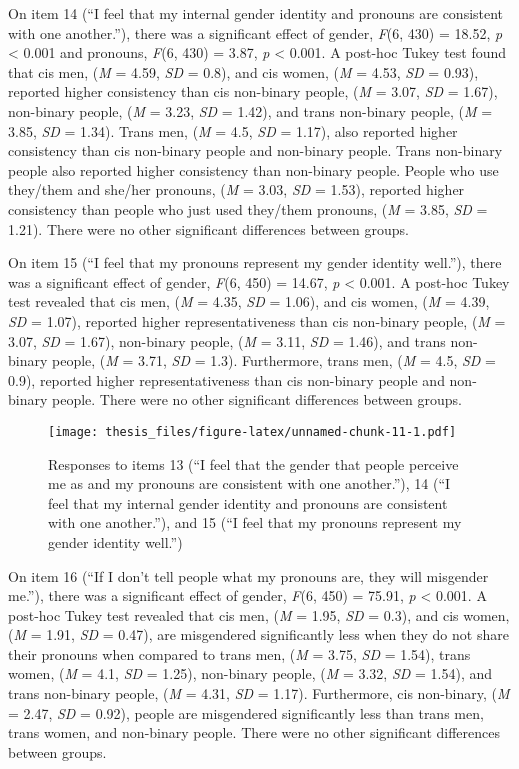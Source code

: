 \documentclass[12pt,twoside]{reedthesis}
\begin{document}
On item 14 (``I feel that my internal gender identity and pronouns are consistent with one another.''), there was a significant effect of gender, \emph{F}(6, 430) = 18.52, \emph{p} \textless{} 0.001 and pronouns, \emph{F}(6, 430) = 3.87, \emph{p} \textless{} 0.001. A post-hoc Tukey test found that cis men, (\emph{M} = 4.59, \emph{SD} = 0.8), and cis women, (\emph{M} = 4.53, \emph{SD} = 0.93), reported higher consistency than cis non-binary people, (\emph{M} = 3.07, \emph{SD} = 1.67), non-binary people, (\emph{M} = 3.23, \emph{SD} = 1.42), and trans non-binary people, (\emph{M} = 3.85, \emph{SD} = 1.34). Trans men, (\emph{M} = 4.5, \emph{SD} = 1.17), also reported higher consistency than cis non-binary people and non-binary people. Trans non-binary people also reported higher consistency than non-binary people. People who use they/them and she/her pronouns, (\emph{M} = 3.03, \emph{SD} = 1.53), reported higher consistency than people who just used they/them pronouns, (\emph{M} = 3.85, \emph{SD} = 1.21). There were no other significant differences between groups.

On item 15 (``I feel that my pronouns represent my gender identity well.''), there was a significant effect of gender, \emph{F}(6, 450) = 14.67, \emph{p} \textless{} 0.001. A post-hoc Tukey test revealed that cis men, (\emph{M} = 4.35, \emph{SD} = 1.06), and cis women, (\emph{M} = 4.39, \emph{SD} = 1.07), reported higher representativeness than cis non-binary people, (\emph{M} = 3.07, \emph{SD} = 1.67), non-binary people, (\emph{M} = 3.11, \emph{SD} = 1.46), and trans non-binary people, (\emph{M} = 3.71, \emph{SD} = 1.3). Furthermore, trans men, (\emph{M} = 4.5, \emph{SD} = 0.9), reported higher representativeness than cis non-binary people and non-binary people. There were no other significant differences between groups.
\begin{figure}
\centering
\texttt{[image: thesis\_files/figure-latex/unnamed-chunk-11-1.pdf]}
\caption{\label{fig:unnamed-chunk-11}Responses to items 13 (``I feel that the gender that people perceive me as and my pronouns are consistent with one another.''), 14 (``I feel that my internal gender identity and pronouns are consistent with one another.''), and 15 (``I feel that my pronouns represent my gender identity well.'')}
\end{figure}
On item 16 (``If I don't tell people what my pronouns are, they will misgender me.''), there was a significant effect of gender, \emph{F}(6, 450) = 75.91, \emph{p} \textless{} 0.001. A post-hoc Tukey test revealed that cis men, (\emph{M} = 1.95, \emph{SD} = 0.3), and cis women, (\emph{M} = 1.91, \emph{SD} = 0.47), are misgendered significantly less when they do not share their pronouns when compared to trans men, (\emph{M} = 3.75, \emph{SD} = 1.54), trans women, (\emph{M} = 4.1, \emph{SD} = 1.25), non-binary people, (\emph{M} = 3.32, \emph{SD} = 1.54), and trans non-binary people, (\emph{M} = 4.31, \emph{SD} = 1.17). Furthermore, cis non-binary, (\emph{M} = 2.47, \emph{SD} = 0.92), people are misgendered significantly less than trans men, trans women, and non-binary people. There were no other significant differences between groups.
\end{document}
